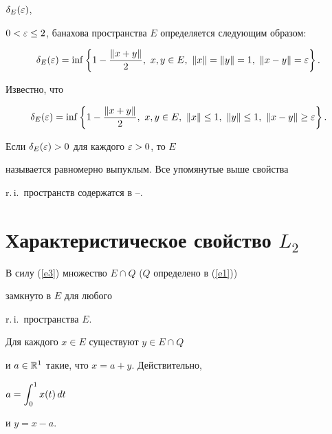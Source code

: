 $\delta _E(\varepsilon)$, 


$0 < \varepsilon\le 2$, банахова пространства $E$ определяется следующим образом:


$$


\delta_E(\eps) = \inf \left\{ 1 - \frac{\|x+y\|}2, \ x,y\in E, \ 


\|x\|= \|y\| = 1,  \ \|x-y\|= \eps\right\}. 


$$


Известно, что


\begin{equation}\label{e7}


\delta_E(\eps) =  


\inf \left\{ 1 - \frac{\|x+y\|}2, \ x,y\in E, \ 


\|x\|\le 1, \ \|y\| \le 1,  \ \|x-y\|\ge \eps\right\}. 


\end{equation}


Если $\delta_E(\varepsilon) >0$ для каждого $\varepsilon >0$, то $E$ 


называется равномерно выпуклым. Все упомянутые выше свойства 


r.\,i.\ пространств содержатся в \cite{LT}--\cite{BS}. 








\section{Характеристическое свойство $L_2$}





В силу (\ref{e3}) множество $E \cap Q$ ($Q$ определено в (\ref{e1}))


замкнуто в $E$ для любого 


r.\,i.\ пространства $E$. 


Для каждого $x\in E$ существуют $y\in E\cap Q$ 


и $a\in \Bbb R^1$ такие, что $x = a + y$. Действительно, 


$a= \displaystyle\int_{0}^{1} x(t)\, dt$


и $y = x-a$. 





